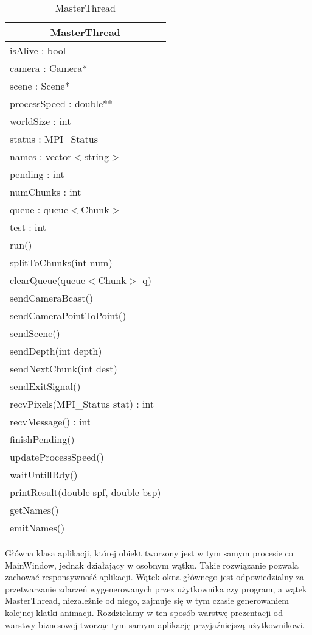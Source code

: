 \footnotesize
\begin{longtable}{|p{14cm}|}
    \caption{MasterThread} \label{tab:MasterThread} \\ \hline
    \multicolumn{1}{|c|}{MasterThread} \\ \hline
    isAlive : bool \\
    camera : Camera* \\
    scene : Scene* \\
    processSpeed : double** \\
    worldSize : int \\
    status : MPI\_Status \\
    names : vector$<$string$>$ \\
    pending : int \\
    numChunks : int \\
    queue : queue$<$Chunk$>$ \\
    test : int \\
    \hline
	run() \\
	splitToChunks(int num) \\
	clearQueue(queue$<$Chunk$>$ q) \\
    sendCameraBcast() \\
    sendCameraPointToPoint() \\
    sendScene() \\
    sendDepth(int depth) \\
    sendNextChunk(int dest) \\
    sendExitSignal() \\
    recvPixels(MPI\_Status stat) : int \\
    recvMessage() : int \\
    finishPending() \\
    updateProcessSpeed() \\
    waitUntillRdy() \\
    printResult(double spf, double bsp) \\
    getNames() \\
    emitNames() \\
	\hline
\end{longtable}
\normalsize

Główna klasa aplikacji, której obiekt tworzony jest w tym samym procesie co MainWindow, jednak działający w osobnym wątku. Takie rozwiązanie pozwala zachować responsywność aplikacji. Wątek okna głównego jest odpowiedzialny za przetwarzanie zdarzeń wygenerowanych przez użytkownika czy program, a wątek MasterThread, niezależnie od niego, zajmuje się w tym czasie generowaniem kolejnej klatki animacji. Rozdzielamy w ten sposób warstwę prezentacji od warstwy biznesowej tworząc tym samym aplikację przyjaźniejszą użytkownikowi.

